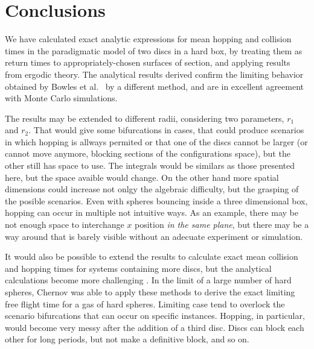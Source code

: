\documentclass[superscriptaddress,pre,reprint,showpacs,twocolumn]{revtex4-1}
\newcommand{\etal}{et al.\ }
\begin{document}
\section{Conclusions}

We have calculated exact analytic expressions for mean hopping and
collision times in the paradigmatic model of two discs in a hard box,
by treating them as return times to  appropriately-chosen surfaces of section, 
and applying results from ergodic theory.
The analytical results derived 
confirm the limiting behavior obtained
by Bowles \etal \cite{Bowles04} by a different method, and are in excellent agreement with Monte Carlo simulations.

The results may be extended to different radii, considering two parameters,
$r_1$ and $r_2$. That would give some bifurcations in cases, that could
produce scenarios in which hopping is allways permited or that one of the
discs cannot be larger (or cannot move anymore,
blocking sections of the configurations space), but the other still has space to use.
The integrals would be similars as those presented here, but the space avaible
would change. 
On the other hand more spatial dimensions could increase not
onlgy the algebraic difficulty, but the grasping of the posible scenarios.
Even with spheres bouncing inside a three dimensional box,
hopping can occur in multiple not intuitive ways. As an example,
there may be not enough space to interchange $x$ position
\emph{in the same plane}, but there may be a way around that
is barely visible without an adecuate experiment or
simulation.


It would also be possible to extend the results to calculate exact mean collision
and hopping times for systems containing more discs,
but the analytical calculations become more challenging \cite{three_hard_discs_2004}.
In the limit of a large number of hard spheres, Chernov \cite{Chernov97}
was able to apply these methods to derive the exact limiting  free flight time for a gas of hard spheres. Limiting case tend to overlock the scenario bifurcations that
can occur on specific instances. Hopping, in particular, would become very
messy after the addition of a third disc. Discs can block each other for long periods,
but not make a definitive block, and so on.
\end{document}
